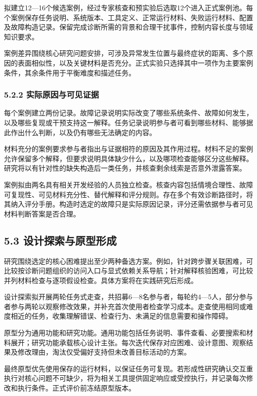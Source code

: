 拟建立12—16个候选案例，经过专家核查和预实验后选取12个进入正式案例池。每个案例保存任务说明、系统版本、工具定义、正常运行材料、失败运行材料、配置及故障构造记录。保留完成诊断所需的背景和合理干扰事件，控制内容长度与领域知识要求。

案例差异围绕核心研究问题安排，可涉及异常发生位置与最终症状的距离、多个原因的表面相似性，以及关键材料是否充分。正式实验只选择其中一项作为主要案例条件，其余条件用于平衡难度和描述任务。

\subsubsection{5.2.2 实际原因与可见证据}

每个案例建立两份记录。故障记录说明实际改变了哪些系统条件、故障如何发生，以及哪些复现或干预支持这一解释。任务记录说明参与者可看到哪些材料、能够据此作出什么判断，以及仍有哪些无法确定的内容。

材料充分的案例要求参与者指出与证据相符的原因及其作用过程。材料不足的案例允许保留多个解释，但要求说明具体缺少什么，以及哪项检查能够区分这些解释。研究将以有针对性的缺失构造后一类任务，并核查剩余线索是否意外泄露答案。

案例拟由两名具有相关开发经验的人员独立检查。核查内容包括情境合理性、故障可复现性、可见材料充分性、替代解释和评分规则。存在多个有效诊断路径时，将其纳入评分手册。构造时选定的故障只是实际原因记录，评分还需依据参与者可见材料判断答案是否合理。

\subsection{5.3 设计探索与原型形成}

研究围绕选定的核心困难提出至少两种备选方案。例如，针对跨步骤关联困难，可比较按诊断问题组织的访问入口与显式依赖关系导航；针对解释核验困难，可比较并列材料检查与逐项假设检查。具体方案将在实践研究后形成。

设计探索拟开展两轮任务式走查，共招募6—8名参与者，每轮约4—5人，部分参与者参与两轮以观察修改效果，并补充首次使用者检查学习成本。走查使用相同或难度相近的任务，收集理解错误、检查行为、未满足的信息需要和操作障碍。

原型分为通用功能和研究功能。通用功能包括任务说明、事件查看、必要搜索和材料展开；研究功能承载核心设计主张。每次迭代保存对应困难、设计意图、观察结果及修改理由，淘汰仅受偏好支持但未改善目标活动的方案。

最终原型优先使用保存的运行材料，以保证任务可复现。若形成性研究确认交互重执行对核心问题不可缺少，将为相关工具提供固定响应或受控执行，并记录每次修改和执行条件。正式评价前冻结原型版本。

